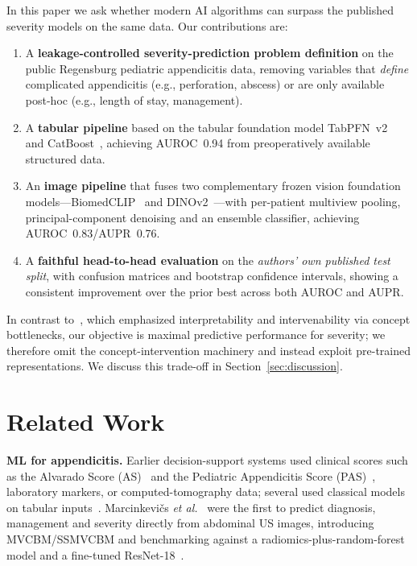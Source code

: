 \documentclass[journal]{IEEEtran}
\begin{document}
In this paper we ask whether modern AI algorithms can surpass the published severity
models on the same data. Our contributions are:
\begin{enumerate}
\item A \textbf{leakage-controlled severity-prediction problem definition} on the
public Regensburg pediatric appendicitis data, removing variables that \emph{define}
complicated appendicitis (e.g., perforation, abscess) or are only available post-hoc
(e.g., length of stay, management).
\item A \textbf{tabular pipeline} based on the tabular foundation model
TabPFN~v2~\cite{hollmann2025accurate} and CatBoost~\cite{prokhorenkova2018catboost},
achieving AUROC~0.94 from preoperatively available structured data.
\item An \textbf{image pipeline} that fuses two complementary frozen vision foundation
models---BiomedCLIP~\cite{zhang2025biomedclip} and DINOv2~\cite{oquab2024dinov2}---with
per-patient multiview pooling, principal-component denoising and an ensemble
classifier, achieving AUROC~0.83/AUPR~0.76.
\item A \textbf{faithful head-to-head evaluation} on the \emph{authors' own published
test split}, with confusion matrices and bootstrap confidence intervals, showing a
consistent improvement over the prior best across both AUROC and AUPR.
\end{enumerate}
In contrast to~\cite{marcinkevics2024interpretable}, which emphasized interpretability
and intervenability via concept bottlenecks, our objective is maximal predictive
performance for severity; we therefore omit the concept-intervention machinery and
instead exploit pre-trained representations. We discuss this trade-off in
Section~\ref{sec:discussion}.

\section{Related Work}
\textbf{ML for appendicitis.} Earlier decision-support systems used clinical scores
such as the Alvarado Score (AS)~\cite{alvarado1986practical} and the Pediatric
Appendicitis Score (PAS)~\cite{samuel2002pediatric}, laboratory markers, or
computed-tomography data; several used classical models on tabular
inputs~\cite{marcinkevics2024interpretable}. Marcinkevi\v{c}s \emph{et
al.}~\cite{marcinkevics2024interpretable,marcinkevics2021using} were the first to
predict diagnosis, management and severity directly from abdominal US images,
introducing MVCBM/SSMVCBM and benchmarking against a radiomics-plus-random-forest
model and a fine-tuned ResNet-18~\cite{he2016deep}.
\end{document}
